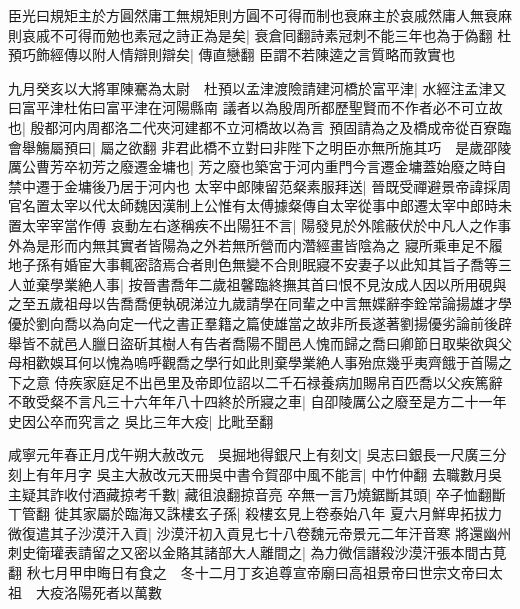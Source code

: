 臣光曰規矩主於方圓然庸工無規矩則方圓不可得而制也衰麻主於哀戚然庸人無衰麻則哀戚不可得而勉也素冠之詩正為是矣|{
	衰倉囘翻詩素冠刺不能三年也為于偽翻}
杜預巧飾經傳以附人情辯則辯矣|{
	傳直戀翻}
臣謂不若陳逵之言質略而敦實也

九月癸亥以大將軍陳騫為太尉　杜預以孟津渡險請建河橋於富平津|{
	水經注孟津又曰富平津杜佑曰富平津在河陽縣南}
議者以為殷周所都歷聖賢而不作者必不可立故也|{
	殷都河内周都洛二代夾河建都不立河橋故以為言}
預固請為之及橋成帝從百寮臨會舉觴屬預曰|{
	屬之欲翻}
非君此橋不立對曰非陛下之明臣亦無所施其巧　是歲邵陵厲公曹芳卒初芳之廢遷金墉也|{
	芳之廢也築宮于河内重門今言遷金墉蓋始廢之時自禁中遷于金墉後乃居于河内也}
太宰中郎陳留范粲素服拜送|{
	晉既受禪避景帝諱採周官名置太宰以代太師魏因漢制上公惟有太傅據粲傳自太宰從事中郎遷太宰中郎時未置太宰宰當作傅}
哀動左右遂稱疾不出陽狂不言|{
	陽發見於外隂蔽伏於中凡人之作事外為是形而内無其實者皆陽為之外若無所營而内濳經畫皆陰為之}
寢所乘車足不履地子孫有婚宦大事輒密諮焉合者則色無變不合則眠寢不安妻子以此知其旨子喬等三人並棄學業絶人事|{
	按晉書喬年二歲祖馨臨終撫其首曰恨不見汝成人因以所用硯與之至五歲祖母以告喬喬便執硯涕泣九歲請學在同輩之中言無媟辭李銓常論揚雄才學優於劉向喬以為向定一代之書正羣籍之篇使雄當之故非所長遂著劉揚優劣論前後辟舉皆不就邑人臘日盜斫其樹人有告者喬陽不聞邑人愧而歸之喬曰卿節日取柴欲與父母相歡娛耳何以愧為嗚呼觀喬之學行如此則棄學業絶人事殆庶幾乎夷齊餓于首陽之下之意}
侍疾家庭足不出邑里及帝即位詔以二千石禄養病加賜帛百匹喬以父疾篤辭不敢受粲不言凡三十六年年八十四終於所寢之車|{
	自卲陵厲公之廢至是方二十一年史因公卒而究言之}
吳比三年大疫|{
	比毗至翻}


咸寧元年春正月戊午朔大赦改元　吳掘地得銀尺上有刻文|{
	吳志曰銀長一尺廣三分刻上有年月字}
吳主大赦改元天冊吳中書令賀邵中風不能言|{
	中竹仲翻}
去職數月吳主疑其詐收付酒藏掠考千數|{
	藏徂浪翻掠音亮}
卒無一言乃燒鋸斷其頭|{
	卒子恤翻斷丅管翻}
徙其家屬於臨海又誅樓玄子孫|{
	殺樓玄見上卷泰始八年}
夏六月鮮卑拓拔力微復遣其子沙漠汗入貢|{
	沙漠汗初入貢見七十八卷魏元帝景元二年汗音寒}
將還幽州刺史衛瓘表請留之又密以金賂其諸部大人離間之|{
	為力微信譖殺沙漠汗張本間古莧翻}
秋七月甲申晦日有食之　冬十二月丁亥追尊宣帝廟曰高祖景帝曰世宗文帝曰太祖　大疫洛陽死者以萬數

